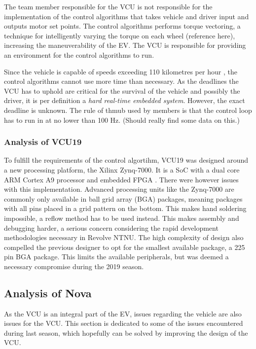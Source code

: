 The team member responsible for the VCU is not responsible for the implementation of the control algorithms that takes vehicle and driver input and outputs motor set points. The control algorithms performs torque vectoring, a technique for intelligently varying the torque on each wheel {\color{red}(reference here)}, increasing the maneuverability of the EV. The VCU is responsible for providing an environment for the control algorithms to run.

Since the vehicle is capable of speeds exceeding 110 kilometres per hour \cite{novaspeed}, the control algorithms cannot use more time than necessary. As the deadlines the VCU has to uphold are critical for the survival of the vehicle and possibly the driver, it is per definition a \emph{hard real-time embedded system}. However, the exact deadline is unknown. The rule of thmub used by members is that the control loop has to run in at no lower than 100 \si{\hertz}. {\color{red}(Should really find some data on this.)}

\subsubsection{Analysis of VCU19}

To fulfill the requirements of the control algortihm, VCU19 was designed around a new processing platform, the Xilinx Zynq-7000. It is a SoC with a dual core ARM Cortex A9 processor and embedded FPGA \cite{zynq}. There were however issues with this implementation. Advanced processing units like the Zynq-7000 are commonly only available in ball grid array (BGA) packages, meaning packages with all pins placed in a grid pattern on the bottom. This makes hand soldering impossible, a reflow method has to be used instead. This makes assembly and debugging harder, a serious concern considering the rapid development methodologies necessary in Revolve NTNU. The high complexity of design also compelled the previous designer to opt for the smallest available package, a 225 pin BGA package. This limits the available peripherals, but was deemed a necessary compromise during the 2019 season.

\subsection{Analysis of Nova}

As the VCU is an integral part of the EV, issues regarding the vehicle are also issues for the VCU. This section is dedicated to some of the issues encountered during last season, which hopefully can be solved by improving the design of the VCU.

